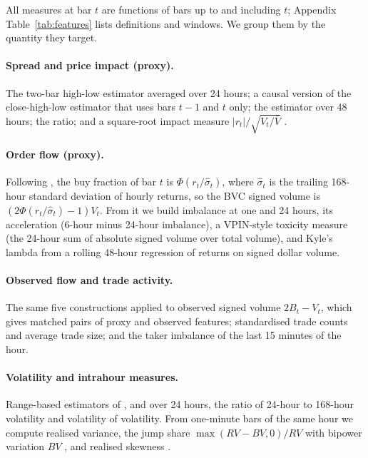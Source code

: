 \documentclass[11pt]{article}
\begin{document}
All measures at bar $t$ are functions of bars up to and including $t$; Appendix
Table~\ref{tab:features} lists definitions and windows. We group them by the quantity they target.

\paragraph{Spread and price impact (proxy).} The two-bar \citet{corwin2012} high-low estimator
averaged over 24 hours; a causal version of the \citet{abdi2017} close-high-low estimator that uses
bars $t-1$ and $t$ only; the \citet{roll1984} estimator over 48 hours; the \citet{amihud2002} ratio;
and a square-root impact measure $|r_t|/\sqrt{V_t/\bar V}$ \citep{bouchaud2018}.

\paragraph{Order flow (proxy).} Following \citet{easley2016}, the buy fraction of bar $t$ is
$\Phi(r_t/\hat\sigma_t)$, where $\hat\sigma_t$ is the trailing 168-hour standard deviation of hourly
returns, so the BVC signed volume is $(2\Phi(r_t/\hat\sigma_t)-1)V_t$. From it we build imbalance at
one and 24 hours, its acceleration (6-hour minus 24-hour imbalance), a VPIN-style toxicity measure
(the 24-hour sum of absolute signed volume over total volume), and Kyle's lambda from a rolling
48-hour regression of returns on signed dollar volume.

\paragraph{Observed flow and trade activity.} The same five constructions applied to observed signed
volume $2B_t-V_t$, which gives matched pairs of proxy and observed features; standardised trade
counts and average trade size; and the taker imbalance of the last 15 minutes of the hour.

\paragraph{Volatility and intrahour measures.} Range-based estimators of \citet{garman1980},
\citet{rogers1991} and \citet{yang2000} over 24 hours, the ratio of 24-hour to 168-hour volatility and
volatility of volatility. From one-minute bars of the same hour we compute realised variance, the
jump share $\max(RV-BV,0)/RV$ with bipower variation $BV$ \citep{bns2004}, and realised skewness
\citep{amaya2015}.
\end{document}
